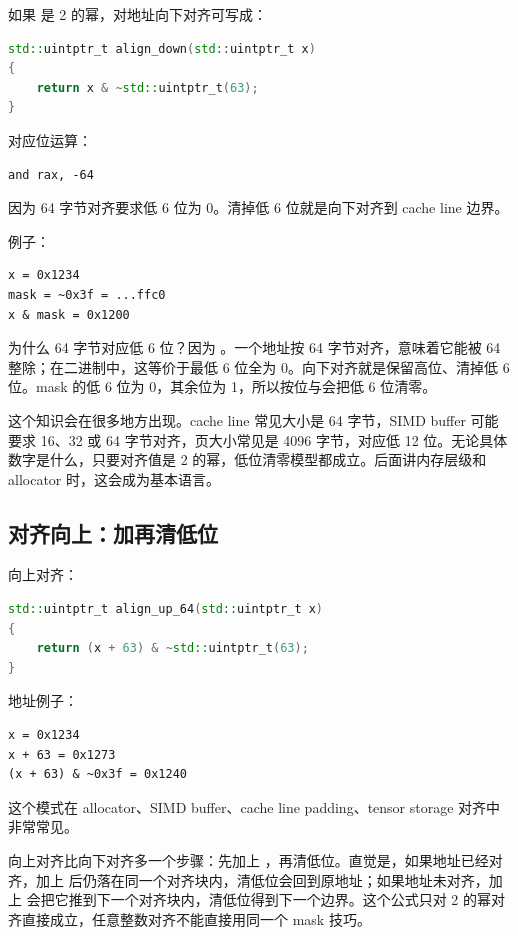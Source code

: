 如果  是 2 的幂，对地址向下对齐可写成：

\begin{lstlisting}[language=C++]
std::uintptr_t align_down(std::uintptr_t x)
{
    return x & ~std::uintptr_t(63);
}
\end{lstlisting}

对应位运算：

\begin{lstlisting}
and rax, -64
\end{lstlisting}

因为 64 字节对齐要求低 6 位为 0。清掉低 6 位就是向下对齐到 cache line 边界。

例子：

\begin{lstlisting}
x = 0x1234
mask = ~0x3f = ...ffc0
x & mask = 0x1200
\end{lstlisting}

为什么 64 字节对应低 6 位？因为 。一个地址按 64 字节对齐，意味着它能被 64 整除；在二进制中，这等价于最低 6 位全为 0。向下对齐就是保留高位、清掉低 6 位。mask  的低 6 位为 0，其余位为 1，所以按位与会把低 6 位清零。

这个知识会在很多地方出现。cache line 常见大小是 64 字节，SIMD buffer 可能要求 16、32 或 64 字节对齐，页大小常见是 4096 字节，对应低 12 位。无论具体数字是什么，只要对齐值是 2 的幂，低位清零模型都成立。后面讲内存层级和 allocator 时，这会成为基本语言。

\subsection{对齐向上：加再清低位}

向上对齐：

\begin{lstlisting}[language=C++]
std::uintptr_t align_up_64(std::uintptr_t x)
{
    return (x + 63) & ~std::uintptr_t(63);
}
\end{lstlisting}

地址例子：

\begin{lstlisting}
x = 0x1234
x + 63 = 0x1273
(x + 63) & ~0x3f = 0x1240
\end{lstlisting}

这个模式在 allocator、SIMD buffer、cache line padding、tensor storage 对齐中非常常见。

向上对齐比向下对齐多一个步骤：先加上 ，再清低位。直觉是，如果地址已经对齐，加上  后仍落在同一个对齐块内，清低位会回到原地址；如果地址未对齐，加上  会把它推到下一个对齐块内，清低位得到下一个边界。这个公式只对 2 的幂对齐直接成立，任意整数对齐不能直接用同一个 mask 技巧。

